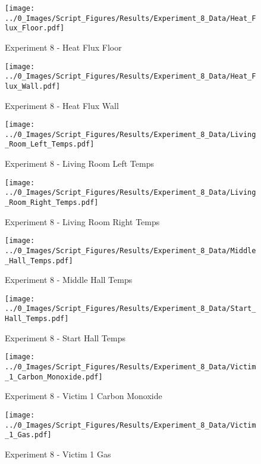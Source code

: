 	\clearpage

	\begin{figure}[H]
		\centering
		\texttt{[image: ../0\_Images/Script\_Figures/Results/Experiment\_8\_Data/Heat\_Flux\_Floor.pdf]}
		\caption[]{Experiment 8 - Heat Flux Floor}
	\end{figure}
 

	\begin{figure}[H]
		\centering
		\texttt{[image: ../0\_Images/Script\_Figures/Results/Experiment\_8\_Data/Heat\_Flux\_Wall.pdf]}
		\caption[]{Experiment 8 - Heat Flux Wall}
	\end{figure}
 
	\clearpage

	\begin{figure}[H]
		\centering
		\texttt{[image: ../0\_Images/Script\_Figures/Results/Experiment\_8\_Data/Living\_Room\_Left\_Temps.pdf]}
		\caption[]{Experiment 8 - Living Room Left Temps}
	\end{figure}
 

	\begin{figure}[H]
		\centering
		\texttt{[image: ../0\_Images/Script\_Figures/Results/Experiment\_8\_Data/Living\_Room\_Right\_Temps.pdf]}
		\caption[]{Experiment 8 - Living Room Right Temps}
	\end{figure}
 
	\clearpage

	\begin{figure}[H]
		\centering
		\texttt{[image: ../0\_Images/Script\_Figures/Results/Experiment\_8\_Data/Middle\_Hall\_Temps.pdf]}
		\caption[]{Experiment 8 - Middle Hall Temps}
	\end{figure}
 

	\begin{figure}[H]
		\centering
		\texttt{[image: ../0\_Images/Script\_Figures/Results/Experiment\_8\_Data/Start\_Hall\_Temps.pdf]}
		\caption[]{Experiment 8 - Start Hall Temps}
	\end{figure}
 
	\clearpage

	\begin{figure}[H]
		\centering
		\texttt{[image: ../0\_Images/Script\_Figures/Results/Experiment\_8\_Data/Victim\_1\_Carbon\_Monoxide.pdf]}
		\caption[]{Experiment 8 - Victim 1 Carbon Monoxide}
	\end{figure}
 

	\begin{figure}[H]
		\centering
		\texttt{[image: ../0\_Images/Script\_Figures/Results/Experiment\_8\_Data/Victim\_1\_Gas.pdf]}
		\caption[]{Experiment 8 - Victim 1 Gas}
	\end{figure}
 

